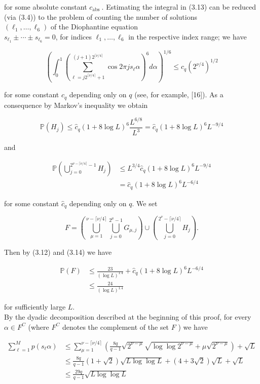 \documentclass[10pt]{article}
\begin{document}
for some absolute constant $c_{\text {abs }}$. Estimating the integral in (3.13) can be reduced (via (3.4)) to the problem of counting the number of solutions\\
$\left(\ell_{1}, \ldots, \ell_{6}\right)$ of the Diophantine equation\\
$s_{\ell_{1}} \pm \cdots \pm s_{\ell_{6}}=0$, for indices $\ell_{1}, \ldots, \ell_{6}$ in the respective index range; we have

$$
\left(\int_{0}^{1}\left(\sum_{\ell=j 2^{\lceil\nu / 4\rceil}+1}^{(j+1) 2^{\lceil\nu / 4\rceil}} \cos 2 \pi j s_{\ell} \alpha\right)^{6} d \alpha\right)^{1 / 6} \leqslant c_{q}\left(2^{\nu / 4}\right)^{1 / 2}
$$

for some constant $c_{q}$ depending only on $q$ (see, for example, [16]). As a consequence by Markov's inequality we obtain

$$
\mathbb{P}\left(H_{j}\right) \leqslant \hat{c}_{q}(1+8 \log L)^{6} \frac{L^{6 / 8}}{L^{3}}=\hat{c}_{q}(1+8 \log L)^{6} L^{-9 / 4}
$$

and


\begin{align*}
\mathbb{P}\left(\bigcup_{j=0}^{2^{\nu-\lceil\nu / 4\rceil}-1} H_{j}\right) & \leqslant L^{3 / 4} \hat{c}_{q}(1+8 \log L)^{6} L^{-9 / 4} \\
& =\hat{c}_{q}(1+8 \log L)^{6} L^{-6 / 4} \tag{3.14}
\end{align*}


for some constant $\hat{c}_{q}$ depending only on $q$. We set

$$
F=\left(\bigcup_{\mu=1}^{\nu-\lceil\nu / 4\rceil} \bigcup_{j=0}^{2^{\mu}-1} G_{\mu, j}\right) \cup\left(\bigcup_{j=0}^{2^{\nu}-\lceil\nu / 4\rceil} H_{j}\right) .
$$

Then by (3.12) and (3.14) we have


\begin{align*}
\mathbb{P}(F) & \leqslant \frac{23}{(\log L)^{1.4}}+\hat{c}_{q}(1+8 \log L)^{6} L^{-6 / 4}  \tag{3.15}\\
& \leqslant \frac{24}{(\log L)^{1.4}} \tag{3.16}
\end{align*}


for sufficiently large $L$.\\
By the dyadic decomposition described at the beginning of this proof, for every $\alpha \in F^{C}$ (where $F^{C}$ denotes the complement of the set $F$ ) we have

$$
\begin{aligned}
\sum_{\ell=1}^{M} p\left(s_{\ell} \alpha\right) & \leqslant \sum_{\mu=1}^{\nu-\lceil\nu / 4\rceil}\left(\frac{8 q}{q-1} \sqrt{2^{\nu-\mu}} \sqrt{\log \log 2^{\nu-\mu}}+\mu \sqrt{2^{\nu-\mu}}\right)+\sqrt{L} \\
& \leqslant \frac{8 q}{q-1}(1+\sqrt{2}) \sqrt{L \log \log L}+(4+3 \sqrt{2}) \sqrt{L}+\sqrt{L} \\
& \leqslant \frac{29 q}{q-1} \sqrt{L \log \log L}
\end{aligned}
$$
\end{document}
